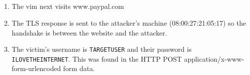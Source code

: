 \documentclass[12pt]{exam}
\begin{document}
\subsection{}

\begin{enumerate}[label=\alph*)]
    \item The vim next visits www.paypal.com
    \item The TLS response is sent to the attacker's machine (08:00:27:21:05:17)
    so the handshake is between the website and the attacker.
    \item The victim's username is \lstinline{TARGETUSER} and their password is
    \lstinline{ILOVETHEINTERNET}.  This was found in the HTTP POST
    application/x-www-form-urlencoded form data.  
\end{enumerate}
\end{document}
